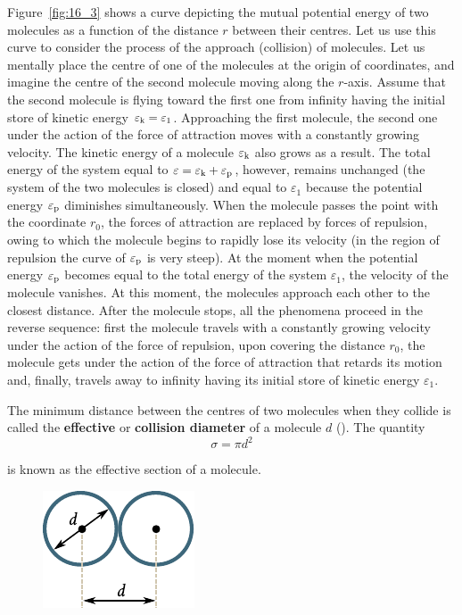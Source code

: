 Figure~\ref{fig:16_3} shows a curve depicting the mutual potential energy of two molecules as a function of the distance $r$ between their
centres. Let us use this curve to consider the process of the approach (collision) of molecules. Let us mentally place the centre of one of the molecules at the origin of coordinates, and imagine the centre of the second molecule moving along the $r$-axis. Assume that the second molecule is flying toward the first one from infinity having the initial store of kinetic energy $\varepsilon_{\text{k}}=\varepsilon_1$. Approaching the first molecule, the second one under the action of the force of attraction moves with a constantly growing velocity. The kinetic energy of a molecule $\varepsilon_{\text{k}}$ also grows as a result. The total energy of the system equal to $\varepsilon=\varepsilon_{\text{k}}+\varepsilon_{\text{p}}$, however, remains unchanged (the system of the two molecules is closed) and equal to $\varepsilon_1$ because the potential energy $\varepsilon_{\text{p}}$ diminishes simultaneously. When the molecule passes the point with the coordinate $r_0$, the forces of attraction are replaced by forces of repulsion, owing to which the molecule begins to rapidly lose its velocity (in the region of repulsion the curve of $\varepsilon_{\text{p}}$ is very steep).
At the moment when the potential energy $\varepsilon_{\text{p}}$ becomes equal to the total energy of the system $\varepsilon_1$, the velocity of the molecule vanishes. At this moment, the molecules approach each other to the closest distance. After the molecule stops, all the phenomena proceed in the reverse sequence: first the molecule travels with a constantly growing velocity under the action of the force of repulsion, upon covering the distance $r_0$, the molecule gets under the action of the force of attraction that retards its motion and, finally, travels away to infinity having its initial store of kinetic energy $\varepsilon_1$.

The minimum distance between the centres of two molecules when they collide is called the \textbf{effective} or \textbf{collision diameter} of a molecule $d$ (). The quantity
\begin{equation}\label{eq:16_6}
    \sigma = \pi d^2
\end{equation}

\noindent
is known as the effective section of a molecule.

\begin{figure}[t]
	\begin{center}
		\includegraphics[scale=1]{figures/ch_16/fig_16_4.pdf}
		\caption[]{}
		\label{fig:16_4}
	\end{center}
	\vspace{-0.8cm}
\end{figure}

